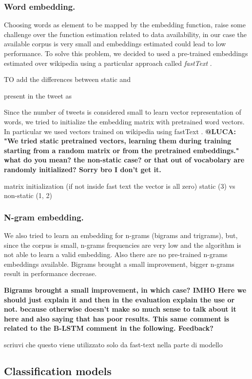 \subsubsection{Word embedding.}
Choosing words as element to be mapped by the embedding function, raise some challenge over the function estimation related to data availability, in our case the available corpus is very small and embeddings estimated could lead to low performance.
To solve this problem, we decided to used a pre-trained embeddings estimated over wikipedia using a particular approach called \emph{fastText} \cite{bojanowski2016enriching}.

TO add the differences between static and 

present in the tweet as 

Since the number of tweets is considered small to learn vector representation of words, we tried to initialize the embedding matrix with pretrained word vectors.
In particular we used vectors trained on wikipedia using fastText \cite{bojanowski2016enriching}.
\textbf{@LUCA: "We tried static pretrained vectors, learning them during training starting from a random matrix or from the pretrained embeddings." what do you mean? the non-static case? or that out of vocabolary are randomly initialized? Sorry bro I don't get it. }

matrix initialization (if not inside fast text the vector is all zero)
static (3) vs non-static (1, 2)


\subsubsection{N-gram embedding.}
We also tried to learn an embedding for n-grams (bigrams and trigrams), but, since the corpus is small, n-grams frequencies are very low and the algorithm is not able to learn a valid embedding.
Also there are no pre-trained n-grams embeddings available.
Bigrams brought a small improvement, bigger n-grams result in performance decrease.

\textbf{Bigrams brought a small improvement, in which case? IMHO Here we should just explain it and then in the evaluation explain the use or not. because otherwise doesn't make so much sense to talk about it here and also saying that has poor results. This same comment is related to the B-LSTM comment in the following. Feedback?}

scriuvi che questo viene utilizzato solo da fast-text nella parte di modello


\subsection{Classification models} \label{subsec:classificationModel}


